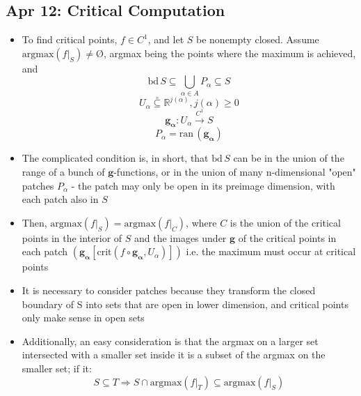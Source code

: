 \documentclass[10pt, oneside]{article}
\let\geq\geqslant
\newcommand{\R}{\mathbb{R}}
\let \foo \O
\renewcommand{\O}{\text{\foo}}
\newcommand{\vecf}[1]{\boldsymbol{#1}}
\begin{document}
\subsection{Apr 12: Critical Computation}
\begin{itemize}
    \item To find critical points, $f \in C^1$, and let $S$ be nonempty closed. Assume $\text{argmax} (f|_S) \neq \O$, argmax being the points where the maximum is achieved, and 
        \[\text{bd} \, S \subseteq \bigcup_{\alpha \in A} P_\alpha \subseteq S\]
        \[U_\alpha \overset{\circ}{\subseteq} \R^{j(\alpha)}, j(\alpha) \geq 0\]
        \[\vecf{g_\alpha} : U_\alpha \overset{C^1}{\rightarrow} S\]
        \[P_\alpha = \text{ran} \, (\vecf{g_\alpha})\]
    \item The complicated condition is, in short, that $\text{bd} \, S$ can be in the union of the range of a bunch of $\vecf{g}$-functions, or in the union of many n-dimensional "open" patches $P_\alpha$ - the patch may only be open in its preimage dimension, with each patch also in $S$
    \item Then, $\text{argmax} (f|_S) = \text{argmax} (f|_C)$, where $C$ is the union of the critical points in the interior of $S$ and the images under $\vecf{g}$ of the critical points in each patch $(\vecf{g_\alpha}[\text{crit}(f \circ\vecf{g_\alpha},U_\alpha)])$ i.e. the maximum must occur at critical points
    \item It is necessary to consider patches because they transform the closed boundary of S into sets that are open in lower dimension, and critical points only make sense in open sets
    \item Additionally, an easy consideration is that the argmax on a larger set intersected with a smaller set inside it is a subset of the argmax on the smaller set; if it:
        \[S \subseteq T \Rightarrow S \cap \text{argmax} (f|_T) \subseteq \text{argmax} (f|_S)\]
\end{itemize}
\end{document}
